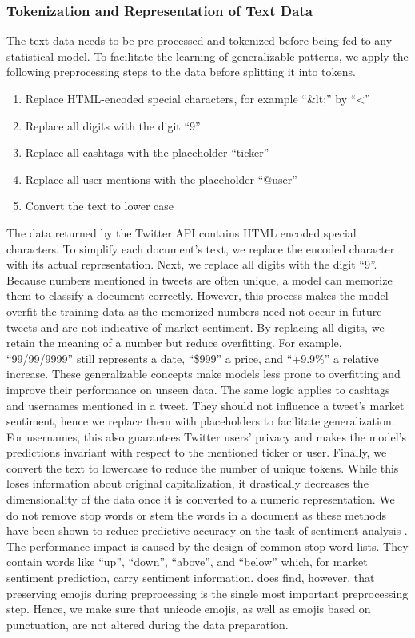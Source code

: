 \subsubsection{Tokenization and Representation of Text Data}
The text data needs to be pre-processed and tokenized before being fed to any statistical model. To facilitate the learning of generalizable patterns, we apply the following preprocessing steps to the data before splitting it into tokens.
\begin{enumerate}[noitemsep]
	\item Replace HTML-encoded special characters, for example ``\&lt;'' by ``<''
	\item Replace all digits with the digit ``9''
	\item Replace all cashtags with the placeholder ``ticker''
	\item Replace all user mentions with the placeholder ``@user''
	\item Convert the text to lower case
\end{enumerate}

The data returned by the Twitter API contains HTML encoded special characters. To simplify each document's text, we replace the encoded character with its actual representation. Next, we replace all digits with the digit ``9''. Because numbers mentioned in tweets are often unique, a model can memorize them to classify a document correctly. However, this process makes the model overfit the training data as the memorized numbers need not occur in future tweets and are not indicative of market sentiment. By replacing all digits, we retain the meaning of a number but reduce overfitting. For example, ``99/99/9999'' still represents a date, ``\$999'' a price, and ``+9.9\%'' a relative increase. These generalizable concepts make models less prone to overfitting and improve their performance on unseen data. The same logic applies to cashtags and usernames mentioned in a tweet. They should not influence a tweet's market sentiment, hence we replace them with placeholders to facilitate generalization. For usernames, this also guarantees Twitter users' privacy and makes the model's predictions invariant with respect to the mentioned ticker or user. Finally, we convert the text to lowercase to reduce the number of unique tokens. While this loses information about original capitalization, it drastically decreases the dimensionality of the data once it is converted to a numeric representation. We do not remove stop words or stem the words in a document as these methods have been shown to reduce predictive accuracy on the task of sentiment analysis . The performance impact is caused by the design of common stop word lists. They contain words like ``up'', ``down'', ``above'', and ``below'' which, for market sentiment prediction, carry sentiment information.  does find, however, that preserving emojis during preprocessing is the single most important preprocessing step. Hence, we make sure that unicode emojis, as well as emojis based on punctuation, are not altered during the data preparation.

